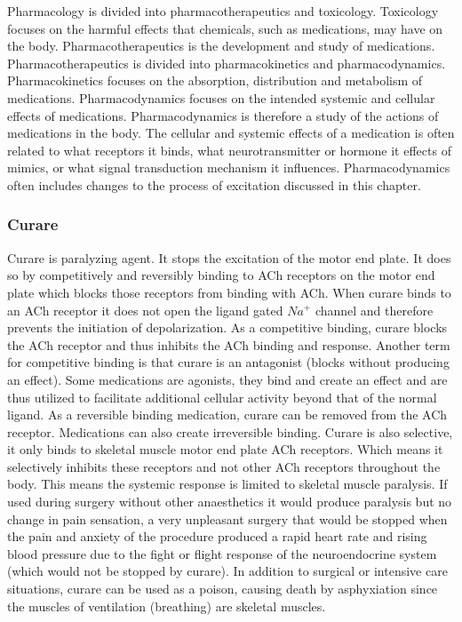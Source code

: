 Pharmacology is divided into pharmacotherapeutics and toxicology. Toxicology focuses on the harmful effects that chemicals, such as medications, may have on the body. Pharmacotherapeutics is the development and study of medications. Pharmacotherapeutics is divided into pharmacokinetics and pharmacodynamics. Pharmacokinetics focuses on the absorption, distribution and metabolism of medications. Pharmacodynamics focuses on the intended systemic and cellular effects of medications. Pharmacodynamics is therefore a study of the actions of medications in the body. The cellular and systemic effects of a medication is often related to what receptors it binds, what neurotransmitter or hormone it effects of mimics, or what signal transduction mechanism it influences. Pharmacodynamics often includes changes to the process of excitation discussed in this chapter.

\subsubsection{Curare}
Curare is paralyzing agent. It stops the excitation of the motor end plate. It does so by competitively and reversibly binding to ACh receptors on the motor end plate which blocks those receptors from binding with ACh. When curare binds to an ACh receptor it does not open the ligand gated $Na^+$ channel and therefore prevents the initiation of depolarization. As a competitive binding, curare blocks the ACh receptor and thus inhibits the ACh binding and response. Another term for competitive binding is that curare is an antagonist (blocks without producing an effect). Some medications are agonists, they bind and create an effect and are thus utilized to facilitate additional cellular activity beyond that of the normal ligand. As a reversible binding medication, curare can be removed from the ACh receptor. Medications can also create irreversible binding. Curare is also selective, it only binds to skeletal muscle motor end plate ACh receptors. Which means it selectively inhibits these receptors and not other ACh receptors throughout the body. This means the systemic response is limited to skeletal muscle paralysis. If used during surgery without other anaesthetics it would produce paralysis but no change in pain sensation, a very unpleasant surgery that would be stopped when the pain and anxiety of the procedure produced a rapid heart rate and rising blood pressure due to the fight or flight response of the neuroendocrine system (which would not be stopped by curare). In addition to surgical or intensive care situations, curare can be used as a poison, causing death by asphyxiation since the muscles of ventilation (breathing) are skeletal muscles. 

